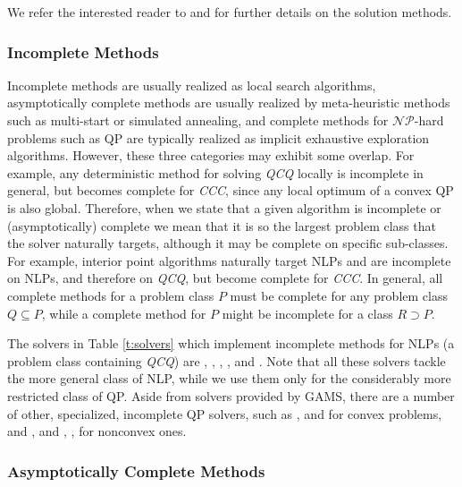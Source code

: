 {We refer the interested reader to 
\cite{book:2077007} and 
\cite{lee2006quadratic} for further details on the solution methods.}



\subsubsection{Incomplete Methods}

Incomplete methods are usually realized as local search algorithms, asymptotically complete methods are usually realized by meta-heuristic methods such as multi-start or simulated annealing, and complete methods for $\mathcal{NP}$-hard problems such as QP are typically realized as implicit exhaustive exploration algorithms. However, these three categories may exhibit some overlap. For example, any deterministic method for solving \textit{QCQ} locally is incomplete in general, but becomes complete for \textit{CCC}, since any local optimum of a convex QP is also global. Therefore, when we state that a given algorithm is incomplete or (asymptotically) complete we mean that it is so the largest problem class that the solver naturally targets, although it may be complete on specific sub-classes. For example, interior point algorithms naturally target NLPs and are incomplete on NLPs, and therefore on \textit{QCQ}, but become complete for \textit{CCC}. In general, all complete methods for a problem class $P$ must be complete for any problem class $Q \subseteq P$, while a complete method for $P$ might be incomplete for a class $R \supset P$.

The solvers in Table \ref{t:solvers} which implement incomplete methods for NLPs (a problem class containing \textit{QCQ}) are \conopt, \ipopt, \minos, \snopt, and \knitro. Note that all these solvers tackle the more general class of NLP, while we use them only for the considerably more restricted class of QP. Aside from solvers provided by GAMS, there are a number of other, specialized, incomplete QP solvers, such as
\cqp \cite{GoulOrbaRobi13:mpc},
\dqp \cite{GoulRobi16:coap} and
\ooqp \cite{GertWrig03:toms}
for convex problems, and
\bqpd \cite{Flet:2000},
\qpa \cite{GoulToin02i} and
\qpb \cite{ConnGoulOrbaToin:2000},
\qpc \cite{GoulOrbaToin03:toms},
\sqic \cite{Gill2015}
for nonconvex ones.

\subsubsection{Asymptotically Complete Methods}\label{sss:asymc}

